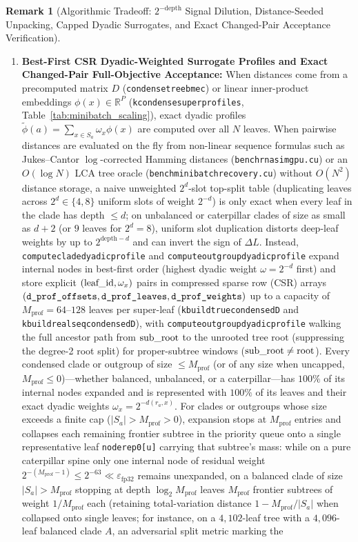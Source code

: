 \documentclass[11pt,a4paper]{article}
\makeatletter
\DeclareRobustCommand{\_}{\ifmmode\nfss@text{\textunderscore}\else\textunderscore\allowbreak\fi}
\theoremstyle{definition}
\newtheorem{remark}[theorem]{Remark}
\makeatother
\begin{document}
\begin{remark}[Algorithmic Tradeoff: $2^{-\text{depth}}$ Signal Dilution, Distance-Seeded Unpacking, Capped Dyadic Surrogates, and Exact Changed-Pair Acceptance Verification]
\begin{enumerate}
    \item \textbf{Best-First CSR Dyadic-Weighted Surrogate Profiles and Exact Changed-Pair Full-Objective Acceptance:} When distances come from a precomputed matrix $D$ (\texttt{condense\_tree\_bme\_c}) or linear inner-product embeddings $\phi(x) \in \mathbb{R}^P$ (\texttt{k\_condense\_super\_profiles}, Table~\ref{tab:minibatch_scaling}), exact dyadic profiles $\widetilde{\phi}(a) = \sum_{x \in S_a} \omega_x \phi(x)$ are computed over all $N$ leaves. When pairwise distances are evaluated on the fly from non-linear sequence formulas such as Jukes--Cantor $\log$-corrected Hamming distances (\texttt{bench\_rnasim\_gpu.cu}) or an $O(\log N)$ LCA tree oracle (\texttt{bench\_minibatch\_recovery.cu}) without $O(N^2)$ distance storage, a naive unweighted $2^d$-slot top-split table (duplicating leaves across $2^d \in \{4, 8\}$ uniform slots of weight $2^{-d}$) is only exact when every leaf in the clade has depth $\le d$; on unbalanced or caterpillar clades of size as small as $d + 2$ (or $9$ leaves for $2^d = 8$), uniform slot duplication distorts deep-leaf weights by up to $2^{\text{depth}-d}$ and can invert the sign of $\Delta L$. Instead, \texttt{compute\_clade\_dyadic\_profile} and \texttt{compute\_outgroup\_dyadic\_profile} expand internal nodes in best-first order (highest dyadic weight $\omega = 2^{-d}$ first) and store explicit $(\text{leaf\_id}, \omega_x)$ pairs in compressed sparse row (CSR) arrays $(\texttt{d\_prof\_offsets}, \texttt{d\_prof\_leaves}, \texttt{d\_prof\_weights})$ up to a capacity of $M_{\text{prof}} = 64\text{--}128$ leaves per super-leaf (\texttt{k\_build\_true\_condensed\_D} and \texttt{k\_build\_real\_seq\_condensed\_D}), with \texttt{compute\_outgroup\_dyadic\_profile} walking the full ancestor path from $\text{sub\_root}$ to the unrooted tree root (suppressing the degree-2 root split) for proper-subtree windows ($\text{sub\_root} \neq \text{root}$). Every condensed clade or outgroup of size $\le M_{\text{prof}}$ (or of any size when uncapped, $M_{\text{prof}} \le 0$)---whether balanced, unbalanced, or a caterpillar---has $100\%$ of its internal nodes expanded and is represented with $100\%$ of its leaves and their exact dyadic weights $\omega_x = 2^{-d(r_a, x)}$. For clades or outgroups whose size exceeds a finite cap ($|S_a| > M_{\text{prof}} > 0$), expansion stops at $M_{\text{prof}}$ entries and collapses each remaining frontier subtree in the priority queue onto a single representative leaf \texttt{node\_rep0[u]} carrying that subtree's mass: while on a pure caterpillar spine only one internal node of residual weight $2^{-(M_{\text{prof}}-1)} \le 2^{-63} \ll \varepsilon_{\text{fp32}}$ remains unexpanded, on a balanced clade of size $|S_a| > M_{\text{prof}}$ stopping at depth $\log_2 M_{\text{prof}}$ leaves $M_{\text{prof}}$ frontier subtrees of weight $1/M_{\text{prof}}$ each (retaining total-variation distance $1 - M_{\text{prof}}/|S_a|$ when collapsed onto single leaves; for instance, on a $4{,}102$-leaf tree with a $4{,}096$-leaf balanced clade $A$, an adversarial split metric marking the 
\end{enumerate}
\end{remark}
\end{document}
